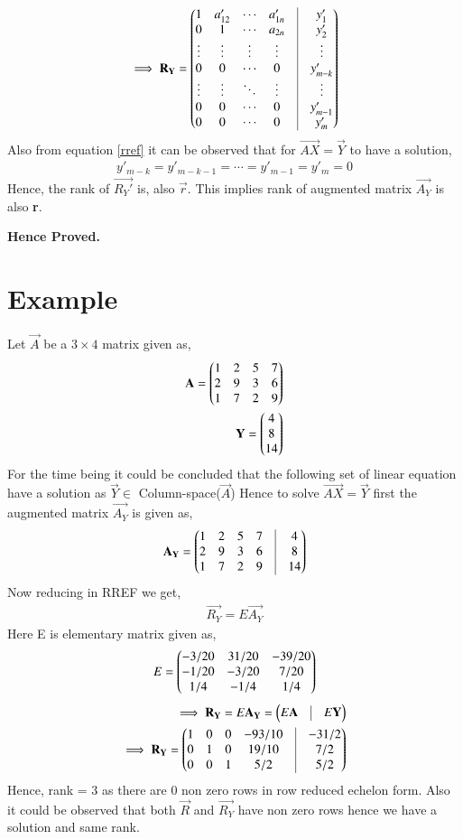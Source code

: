 \documentclass[journal,12pt,twocolumn]{IEEEtran}
\begin{document}
\begin{align}
\implies \vec{R_Y} = \myvec{1&a'_{12}&\cdots&a'_{1n}&\vrule&y'_{1} \\0&1&\cdots&a_{2n}&\vrule&y'_{2}\\\vdots&\vdots&\vdots&\vdots&\vrule&\vdots\\0&0&\cdots&0&\vrule&y'_{m-k}\\\vdots&\vdots&\ddots&\vdots&\vrule&\vdots\\0&0&\cdots&0&\vrule&y'_{m-1}\\0&0&\cdots&0&\vrule&y'_{m}}\label{rref}
\end{align}
Also from equation \eqref{rref} it can be observed that for   $\vec{AX}=\vec{Y}$ to have a solution,
\begin{align}
y'_{m-k} = y'_{m-k-1} = \cdots = y'_{m-1} = y'_{m} = 0 
\end{align} 
Hence, the rank of $\vec{R_Y'}$ is, also $\vec{r}$. This implies rank of augmented matrix $\vec{A_Y}$ is also \textbf{r}. \\
\centerline{\textbf{Hence Proved.}}
\section{Example}
Let $\vec{A}$ be a $3\times 4$ matrix given as,
\begin{align}
\mathbf{A} = \begin{pmatrix}1&2&5&7\\2&9&3&6\\1&7&2&9\end{pmatrix}\\
\mathbf{Y} = \begin{pmatrix}4\\8\\14\end{pmatrix}
\end{align}
For the time being it could be concluded that the following set of linear equation have a solution as $\vec{Y} \in$ Column-space($\vec{A}$)
Hence to solve $\vec{AX} = \vec{Y}$ first the augmented matrix $\vec{A_Y}$ is given as,
\begin{align}
\vec{A_Y} = \myvec{1&2&5&7&\vrule&4\\2&9&3&6&\vrule&8\\1&7&2&9&\vrule&14}
\end{align}
Now reducing in RREF we get,
\begin{align}
\vec{R_Y} = E\vec{A_Y}
\end{align}
Here E is elementary matrix given as,
\begin{align}
E = \begin{pmatrix}-3/20&31/20&-39/20\\-1/20&-3/20&7/20\\1/4&-1/4&1/4\end{pmatrix}
\end{align}
\begin{align}
\implies \vec{R_Y} = E\vec{A_Y} = \myvec{E\vec{A}&\vrule&E\vec{Y}}\\
\implies \vec{R_Y} = \myvec{1&0&0&-93/10&\vrule&-31/2\\0&1&0&19/10&\vrule&7/2\\0&0&1&5/2&\vrule&5/2}
\end{align}
Hence, rank = 3 as there are 0 non zero rows in row reduced echelon form. Also it could be observed that both $\vec{R}$ and $\vec{R_Y}$ have non zero rows hence we have a solution and same rank.  
\end{document}
